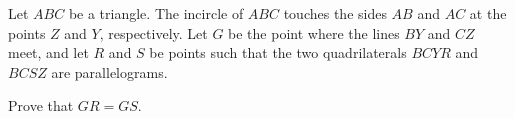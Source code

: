 Let $ABC$ be a triangle. The incircle of $ABC$ touches the sides $AB$ and $AC$ at the points $Z$ and $Y$, respectively. Let $G$ be the point where the lines $BY$ and $CZ$ meet, and let $R$ and $S$ be points such that the two quadrilaterals $BCYR$ and $BCSZ$ are parallelograms.

Prove that $GR = GS$.
